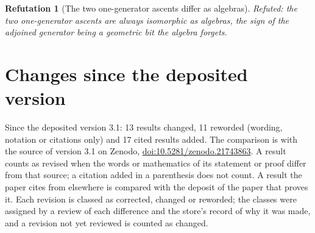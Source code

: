 \documentclass[11pt]{article}
\newtheorem{refutation}[theorem]{Refutation}
\theoremstyle{definition}
\theoremstyle{plain}
\begin{document}
\begin{refutation}[The two one-generator ascents differ as algebras]\label{c:refuted.the-two-one-generator-ascents-differ-as-algebras}
Refuted: the two one-generator ascents are always isomorphic as algebras, the sign of the adjoined generator being a geometric bit the algebra forgets.
\end{refutation}

\section*{Changes since the deposited version}
Since the deposited version 3.1: 13 results changed, 11 reworded (wording, notation or citations only) and 17 cited results added. The comparison is with the source of version 3.1 on Zenodo, \href{https://doi.org/10.5281/zenodo.21743863}{doi:10.5281/zenodo.21743863}. A result counts as revised when the words or mathematics of its statement or proof differ from that source; a citation added in a parenthesis does not count. A result the paper cites from elsewhere is compared with the deposit of the paper that proves it. Each revision is classed as corrected, changed or reworded; the classes were assigned by a review of each difference and the store's record of why it was made, and a revision not yet reviewed is counted as changed.
\end{document}
